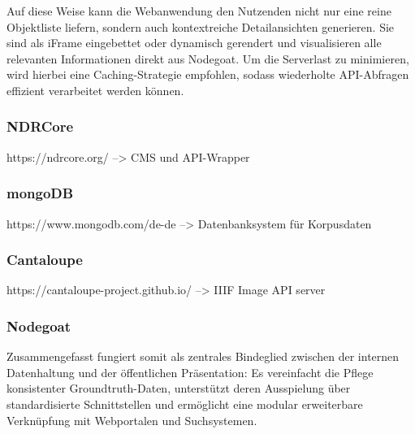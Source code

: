 \documentclass[12pt, a4paper, ngerman, bidi=default]{article}
\begin{document}
Auf diese Weise kann die Webanwendung den Nutzenden nicht nur eine reine Objektliste liefern, sondern auch kontextreiche Detailansichten generieren. Sie sind als iFrame eingebettet oder dynamisch 
gerendert und visualisieren alle relevanten Informationen direkt aus Nodegoat. Um die Serverlast zu minimieren, wird hierbei eine Caching-Strategie empfohlen, sodass wiederholte API-Abfragen 
effizient verarbeitet werden können.

\subsubsection{NDRCore}

https://ndrcore.org/ --> CMS und API-Wrapper
\subsubsection{mongoDB}
https://www.mongodb.com/de-de  --> Datenbanksystem für Korpusdaten
\subsubsection{Cantaloupe}
https://cantaloupe-project.github.io/  --> IIIF Image API server
\subsubsection{Nodegoat}
Zusammengefasst fungiert  somit als zentrales Bindeglied zwischen der internen Datenhaltung und der öffentlichen Präsentation: Es vereinfacht die Pflege konsistenter Groundtruth-Daten, 
unterstützt deren Ausspielung über standardisierte Schnittstellen und ermöglicht eine modular erweiterbare Verknüpfung mit Webportalen und Suchsystemen.



\end{document}
